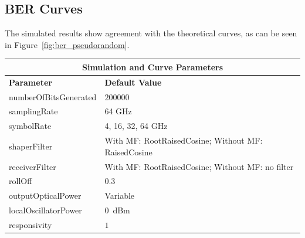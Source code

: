 \begin{refsection}
\subsection*{BER Curves}

The simulated results show agreement with the theoretical curves, as can be seen in Figure~\ref{fig:ber_pseudorandom}.

\begin{table}[H]
	\centering
	\begin{tabular}{|l|l|}
	\hline
	\multicolumn{2}{|c|}{ \textbf{Simulation and Curve Parameters} } \\
		\hline
		\textbf{Parameter}     & \textbf{Default Value}                                     \\\hline
		numberOfBitsGenerated  & 
		$200000$	                                                \\\hline
		samplingRate           & 64 GHz															\\\hline
		symbolRate		       & 4, 16, 32, 64 
		GHz                                                    		\\\hline
		shaperFilter		   & With MF: RootRaisedCosine; Without MF: 
		RaisedCosine	    \\\hline
		receiverFilter		   & With MF: RootRaisedCosine; Without MF: no 
		filter 		\\\hline
		rollOff				   & 0.3														\\\hline
		outputOpticalPower     & Variable                                                   \\ \hline
		localOscillatorPower   & $0$~dBm                                                    \\ \hline
		responsivity           & $1$                                                        \\ \hline

\end{tabular}
\end{table}
\end{refsection}
